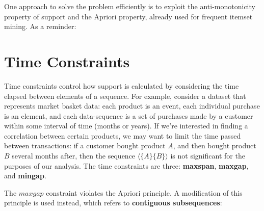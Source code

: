 One approach to solve the problem efficiently is to exploit the anti-monotonicity property of support and the Apriori property, already used for frequent itemset mining. As a reminder:


\section{Time Constraints}
\label{sec:tconstr}

Time constraints control how support is calculated by considering the time elapsed between elements of a sequence. For example, consider a dataset that represents market basket data: each product is an event, each individual purchase is an element, and each data-sequence is a set of purchases made by a customer within some interval of time (months or years). If we're interested in finding a correlation between certain products, we may want to limit the time passed between transactions: if a customer bought product $A$, and then bought product $B$ several months after, then the sequence $\langle \{A\} \{B\} \rangle$ is not significant for the purposes of our analysis. The time constraints are three: \textbf{maxspan}, \textbf{maxgap}, and \textbf{mingap}.


The $maxgap$ constraint violates the Apriori principle. A modification of this principle is used instead, which refers to \textbf{contiguous subsequences}: 

